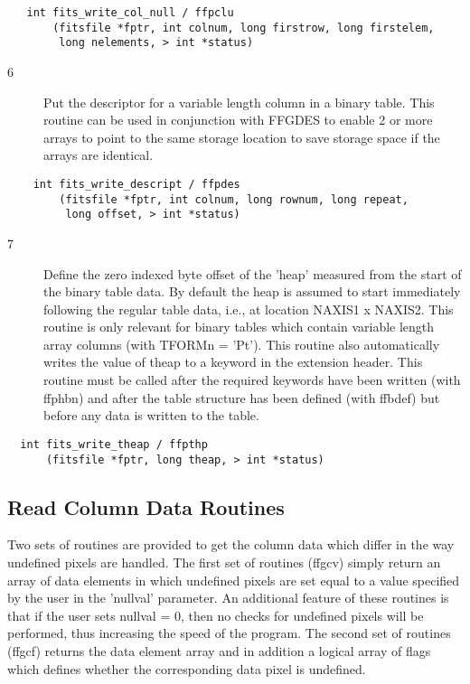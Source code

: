\begin{verbatim}
   int fits_write_col_null / ffpclu
       (fitsfile *fptr, int colnum, long firstrow, long firstelem,
        long nelements, > int *status)
\end{verbatim}

\begin{description}
\item[6 ] Put the descriptor for a variable length column in a binary table.
    This routine can be used in conjunction with FFGDES to enable
    2 or more arrays to point to the same storage location to save
   storage space if the arrays are identical.
\end{description}

\begin{verbatim}
    int fits_write_descript / ffpdes
        (fitsfile *fptr, int colnum, long rownum, long repeat,
         long offset, > int *status)
\end{verbatim}

\begin{description}
\item[7 ] Define the zero indexed byte offset of the 'heap' measured from
    the start of the binary table data.  By default the heap is assumed
    to start immediately following the regular table data, i.e., at
    location NAXIS1 x NAXIS2.  This routine is only relevant for
    binary tables which contain variable length array columns (with
    TFORMn = 'Pt').  This routine also automatically writes
    the value of theap to a keyword in the extension header.  This
    routine must be called after the required keywords have been
    written (with ffphbn) and after the table structure has been defined
   (with ffbdef) but before any data is written to the table.
\end{description}

\begin{verbatim}
  int fits_write_theap / ffpthp
      (fitsfile *fptr, long theap, > int *status)
\end{verbatim}

\subsection{ Read Column Data Routines \label{FFGCL}}

Two sets of routines are provided to get the column data which differ in the way
undefined pixels are handled.  The first set of routines (ffgcv)
simply return an array of data elements in which undefined pixels are
set equal to a value specified by the user in the 'nullval' parameter.
An additional feature of these routines is that if the user sets
nullval = 0, then no checks for undefined pixels will be performed,
thus increasing the speed of the program.  The second set of routines
(ffgcf) returns the data element array and in addition a logical array
of flags which defines whether the corresponding data pixel is undefined.


